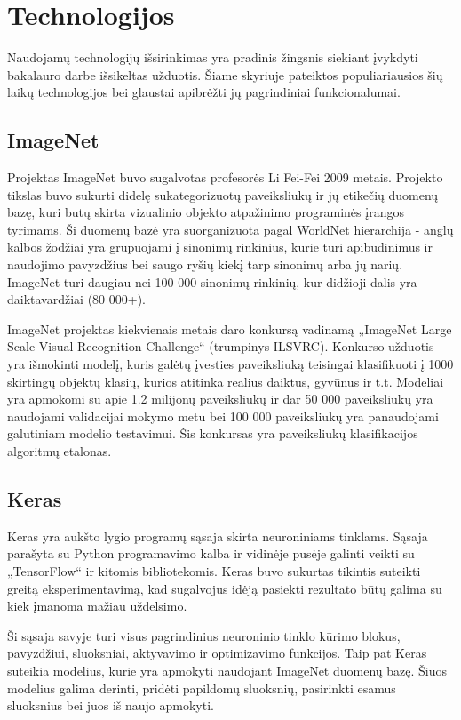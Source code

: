 \documentclass{VUMIFPSbakalaurinis}
\begin{document}
\section{Technologijos}
Naudojamų technologijų išsirinkimas yra pradinis žingsnis siekiant įvykdyti bakalauro darbe išsikeltas užduotis. Šiame skyriuje pateiktos populiariausios šių laikų technologijos 
bei glaustai apibrėžti jų pagrindiniai funkcionalumai.

\subsection{ImageNet}
Projektas ImageNet buvo sugalvotas profesorės Li Fei-Fei 2009 metais. Projekto tikslas buvo sukurti didelę sukategorizuotų paveiksliukų ir jų etikečių duomenų bazę, 
kuri butų skirta vizualinio objekto atpažinimo programinės įrangos tyrimams. Ši duomenų bazė yra suorganizuota pagal WorldNet hierarchija - anglų kalbos žodžiai 
yra grupuojami į sinonimų rinkinius, kurie turi apibūdinimus ir naudojimo pavyzdžius bei saugo ryšių kiekį tarp sinonimų arba jų narių. ImageNet turi daugiau nei 
100 000 sinonimų rinkinių, kur didžioji dalis yra daiktavardžiai (80 000+). 

ImageNet projektas kiekvienais metais daro konkursą vadinamą „ImageNet Large Scale Visual Recognition Challenge“ (trumpinys ILSVRC). Konkurso užduotis yra 
išmokinti modelį, kuris galėtų įvesties paveiksliuką teisingai klasifikuoti į 1000 skirtingų objektų klasių, kurios atitinka realius daiktus, gyvūnus ir t.t. Modeliai 
yra apmokomi su apie 1.2 milijonų paveiksliukų ir dar 50 000 paveiksliukų yra naudojami validacijai mokymo metu bei 100 000 paveiksliukų yra panaudojami galutiniam 
modelio testavimui. Šis konkursas yra paveiksliukų klasifikacijos algoritmų etalonas.

\subsection{Keras}
Keras yra aukšto lygio programų sąsaja skirta neuroniniams tinklams. Sąsaja parašyta su Python programavimo kalba ir vidinėje pusėje galinti veikti su „TensorFlow“ 
ir kitomis bibliotekomis. Keras buvo sukurtas tikintis suteikti greitą eksperimentavimą, kad sugalvojus idėją pasiekti rezultato būtų galima su kiek įmanoma mažiau uždelsimo.

Ši sąsaja savyje turi visus pagrindinius neuroninio tinklo kūrimo blokus, pavyzdžiui, sluoksniai, aktyvavimo ir optimizavimo funkcijos. Taip pat Keras suteikia modelius, 
kurie yra apmokyti naudojant ImageNet duomenų bazę. Šiuos modelius galima derinti, pridėti papildomų sluoksnių, pasirinkti esamus sluoksnius bei juos iš naujo apmokyti.
\end{document}
